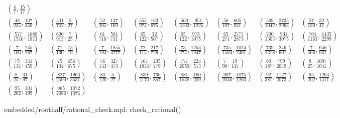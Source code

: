 \documentclass[reqno]{amsart}
\renewcommand{\:}{\colon}
\theoremstyle{definition}
\begin{document}
\[\begin{array}{cccccccc}
  \left(\frac{   4}{   7},\frac{  15}{  17}\right)\\
  \left(\frac{  48}{ 235},\frac{ 107}{ 459}\right) &
  \left(\frac{ 501}{ 742},\frac{   5}{  27}\right) &
  \left(\frac{  52}{ 205},\frac{ 137}{ 169}\right) &
  \left(\frac{ 555}{ 974},\frac{ 163}{ 675}\right) &
  \left(\frac{ 560}{3163},\frac{ 951}{1225}\right) &
  \left(\frac{  56}{ 107},\frac{ 605}{ 931}\right) &
  \left(\frac{ 569}{1042},\frac{2735}{2993}\right) &
  \left(\frac{  57}{ 130},\frac{  32}{  41}\right)\\
  \left(\frac{ 577}{1546},\frac{1680}{1873}\right) &
  \left(\frac{ 600}{ 913},\frac{   7}{  25}\right) &
  \left(\frac{  61}{ 718},\frac{ 581}{ 731}\right) &
  \left(\frac{  65}{ 122},\frac{  32}{ 507}\right) &
  \left(\frac{  65}{ 122},\frac{ 973}{1075}\right) &
  \left(\frac{  65}{ 274},\frac{2777}{2873}\right) &
  \left(\frac{ 700}{1303},\frac{ 931}{3075}\right) &
  \left(\frac{ 704}{1163},\frac{1435}{2299}\right)\\
  \left(\frac{   7}{ 106},\frac{ 245}{ 267}\right) &
  \left(\frac{  71}{ 130},\frac{  13}{  19}\right) &
  \left(\frac{   7}{ 194},\frac{1855}{3777}\right) &
  \left(\frac{  72}{ 115},\frac{ 217}{ 729}\right) &
  \left(\frac{  73}{ 274},\frac{1253}{1947}\right) &
  \left(\frac{ 735}{1594},\frac{1024}{2401}\right) &
  \left(\frac{ 739}{1318},\frac{ 249}{ 601}\right) &
  \left(\frac{   7}{ 466},\frac{ 656}{ 931}\right)\\
  \left(\frac{  75}{ 134},\frac{ 341}{ 459}\right) &
  \left(\frac{  75}{ 134},\frac{ 656}{ 675}\right) &
  \left(\frac{  76}{ 143},\frac{ 327}{ 473}\right) &
  \left(\frac{ 767}{1834},\frac{ 235}{ 779}\right) &
  \left(\frac{ 777}{2050},\frac{ 224}{ 513}\right) &
  \left(\frac{   7}{  90},\frac{  19}{ 147}\right) &
  \left(\frac{  80}{ 187},\frac{ 799}{2049}\right) &
  \left(\frac{   8}{  25},\frac{1007}{1041}\right)\\
  \left(\frac{   8}{  25},\frac{  31}{  97}\right) &
  \left(\frac{ 827}{2590},\frac{1963}{3531}\right) &
  \left(\frac{  83}{ 126},\frac{   5}{  27}\right) &
  \left(\frac{ 839}{2170},\frac{ 736}{ 857}\right) &
  \left(\frac{ 881}{1538},\frac{ 160}{ 209}\right) &
  \left(\frac{ 907}{2046},\frac{1075}{1203}\right) &
  \left(\frac{  92}{ 381},\frac{1127}{2073}\right) &
  \left(\frac{  95}{ 202},\frac{1264}{1411}\right)\\
  \left(\frac{  95}{ 202},\frac{ 301}{ 499}\right) &
  \left(\frac{ 965}{2086},\frac{1072}{1075}\right) &
 \end{array}
\]
\begin{checks}
 embedded/roothalf/rational_check.mpl: check_rational()
\end{checks}
\end{document}
